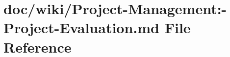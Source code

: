 \hypertarget{_project-_management_1-_project-_evaluation_8md}{}\section{doc/wiki/\+Project-\/\+Management\+:-\/\+Project-\/\+Evaluation.md File Reference}
\label{_project-_management_1-_project-_evaluation_8md}
